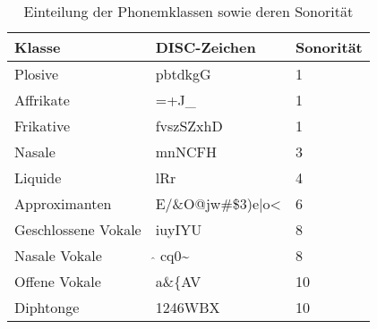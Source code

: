 \begin{table}[h]
    \centering
    \caption{Einteilung der Phonemklassen sowie deren Sonorität}
    \label{table:sonority}
    \begin{tabular}{|l|l|l|}
    \hline
    {\bf Klasse}        & {\bf DISC-Zeichen} & {\bf Sonorität} \\ \hline
    Plosive             & pbtdkgG            & 1         \\
    Affrikate           & =+J\_              & 1         \\
    Frikative           & fvszSZxhD          & 1         \\
    Nasale              & mnNCFH             & 3         \\
    Liquide             & lRr                & 4         \\
    Approximanten       & E/\&O@jw\#\$3)e|o< & 6         \\
    Geschlossene Vokale & iuyIYU             & 8         \\
    Nasale Vokale       & $\hat{}$ cq0\~     & 8         \\
    Offene Vokale       & a\&\{AV            & 10        \\
    Diphtonge           & 1246WBX            & 10        \\ \hline
    \end{tabular}
\end{table}